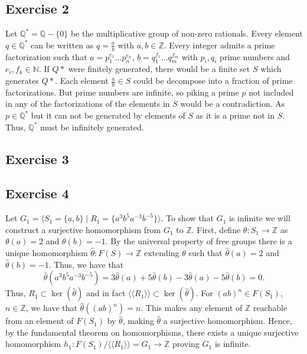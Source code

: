 \documentclass[11pt,a4paper]{article}
\newcommand{\Z}{\mathbb Z}
\newcommand{\Q}{\mathbb Q}
\newcommand{\N}{\mathbb N}
\begin{document}
\subsection*{Exercise 2}
Let $ \Q^* = \Q - \{0\} $ be the multiplicative group of non-zero rationals. Every element $ q \in \Q^* $ can be written as $ q = \frac{a}{b} $ with $ a, b \in \Z $. Every integer admits a prime factorization such that $ a = p_1^{e_1} \dots p_n^{e_n} $, $ b = q_1^{f_1} \dots q_m^{f_m} $ with $p_i, q_i $ prime numbers and $ e_i, f_k \in \N$. If $Q*$ were finitely generated, there would be a finite set $ S $ which generates $Q*$. Each element  $ \frac{a}{b} \in S $ could be decompose into a fraction of prime factorizations. But prime numbers are infinite, so piking a prime $ p $ not included in any of the factorizations of the elements in $ S $ would be a contradiction. As $ p \in \Q^*$ but it can not be generated by elements of $ S $ as it is a prime not in $ S $. Thus, $ \Q^*$ must be infinitely generated.

\subsection*{Exercise 3}

\subsection*{Exercise 4}
Let $ G_1 = \langle S_1 = \{a, b\} \mid R_1 = \{a^3 b^5 a^{-3} b^{-5}\} \rangle $. To show that $ G_1 $ is infinite we will construct a surjective homomorphism from $ G_1 $ to $ \Z $. First, define $ \theta \colon S_1 \to \Z $ as $ \theta(a) = 2 $ and $ \theta(b) = -1 $. By the universal property of free groups there is a unique homomorphism $ \hat \theta \colon F(S) \to \Z $ extending $ \theta $ such that $ \hat \theta(a) = 2 $ and $ \hat \theta(b) = -1 $. Thus, we have that
$$
  \hat \theta (a^3 b^5 a^{-3} b^{-5}) = 3 \hat\theta(a) + 5 \hat\theta(b) - 3 \hat\theta(a) - 5 \hat\theta(b) = 0.
$$
Thus, $ R_1 \subset \ker (\hat \theta) $ and in fact $ \langle \langle R_1 \rangle \rangle \subset \ker (\hat \theta) $. For $ (ab)^n \in F(S_1)$, $ n \in \Z $, we have that $ \hat \theta((ab)^n) = n $. This makes any element of $\Z$ reachable from an element of $ F(S_1) $ by $ \hat \theta $, making $ \hat \theta $ a surjective homomorphism. Hence, by the fundamental theorem on homomorphisms, there exists a unique surjective homomorphism $ h_1: F(S_1)/\langle \langle R_1 \rangle \rangle = G_1 \to \Z $ proving $ G_1 $ is infinite.
\end{document}
